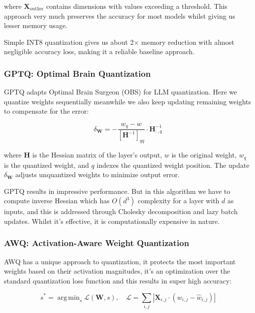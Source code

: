 \documentclass[conference]{IEEEtran}
\DeclareMathOperator*{\argmin}{arg\,min}
\begin{document}
where $\mathbf{X}_{\text{outlier}}$ contains dimensions with values exceeding a threshold. This approach very much preserves the accuracy for most models whilst giving us lesser memory usage.

Simple INT8 quantization gives us about 2$\times$ memory reduction with almost negligible accuracy loss, making it a reliable baseline approach.

\subsubsection{GPTQ: Optimal Brain Quantization}

GPTQ \cite{frantar2022gptq} adapts Optimal Brain Surgeon (OBS) \cite{lecun1990optimal} for LLM quantization. Here we quantize weights sequentially meanwhile we also keep updating remaining weights to compensate for the error:

\begin{equation}
\delta_{\mathbf{W}} = -\frac{w_q - w}{[\mathbf{H}^{-1}]_{qq}} \cdot \mathbf{H}^{-1}_{:,q}
\end{equation}

where $\mathbf{H}$ is the Hessian matrix of the layer's output, $w$ is the original weight, $w_q$ is the quantized weight, and $q$ indexes the quantized weight position. The update $\delta_{\mathbf{W}}$ adjusts unquantized weights to minimize output error.

GPTQ results in impressive performance. But in this algorithm we have to compute inverse Hessian which has $O(d^3)$ complexity for a layer with $d$ as inputs, and this is addressed through Cholesky decomposition and lazy batch updates. Whilst it's effective, it is computationally expensive in nature.

\subsubsection{AWQ: Activation-Aware Weight Quantization}

AWQ has a unique approach to quantization, it protects the most important weights based on their activation magnitudes, it's an optimization over the standard quantization loss function and this results in super high accuracy:

\begin{equation}
s^* = \argmin_{s} \mathcal{L}(\mathbf{W}, s), \quad \mathcal{L} = \sum_{i,j} \left| \mathbf{X}_{i,j} \cdot (w_{i,j} - \hat{w}_{i,j}) \right|
\end{equation}
\end{document}
